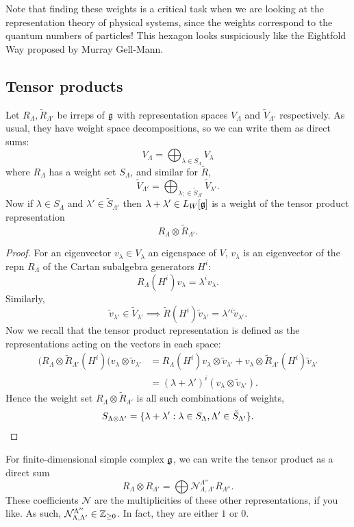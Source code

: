 Note that finding these weights is a critical task when we are looking at the representation theory of physical systems, since the weights correspond to the quantum numbers of particles! This hexagon looks suspiciously like the Eightfold Way proposed by Murray Gell-Mann.

\subsection*{Tensor products} Let $R_\Lambda,\tilde R_{\Lambda'}$ be irreps of $\mathfrak{g}$ with representation spaces $V_\Lambda$ and $\tilde V_{\Lambda'}$ respectively. As usual, they have weight space decompositions, so we can write them as direct sums:
$$V_\Lambda =\bigoplus_{\lambda\in S_\Lambda}V_\lambda$$
where $R_\Lambda$ has a weight set $S_\Lambda$, and similar for $\tilde R$,
$$\tilde V_{\Lambda'} =\bigoplus_{\lambda;\in \tilde S_{\Lambda'}}\tilde V_{\lambda'}.$$
Now if $\lambda \in S_\Lambda$ and $\lambda'\in \tilde S_{\Lambda'}$ then $\lambda+\lambda'\in L_W[\mathfrak{g}]$ is a weight of the tensor product representation
$$R_\Lambda \otimes \tilde R_{\Lambda'}.$$
\begin{proof}
For an eigenvector $v_\lambda \in V_\lambda$ an eigenspace of $V$, $v_\lambda$ is an eigenvector of the repn $R_\Lambda$ of the Cartan subalgebra generators $H^i$:
$$R_\Lambda(H^i)v_\lambda=\lambda^i v_\lambda.$$
Similarly,
$$\tilde v_{\lambda'}\in \tilde V_{\lambda'}\implies \tilde R(H^i)\tilde v_{\lambda'} = \lambda'{}^i \tilde v_{\lambda'}.$$
Now we recall that the tensor product representation is defined as the representations acting on the vectors in each space:
\begin{align*}
    (R_\Lambda \otimes \tilde R_{\Lambda'}(H^i)(v_\lambda\otimes \tilde v_{\lambda'}&= R_\Lambda (H^i)v_\lambda \otimes \tilde v_{\lambda'}
    +v_\lambda \otimes \tilde R_{\Lambda'}(H^i)\tilde v_{\lambda'}\\
    &=(\lambda+\lambda')^i(v_\lambda\otimes \tilde v_{\lambda'}).
\end{align*}
Hence the weight set $R_\Lambda \otimes \tilde R_{\Lambda'}$ is all such combinations of weights,
$$S_{\Lambda\otimes \Lambda'}=\{\lambda+\lambda':\lambda\in S_\Lambda, \Lambda' \in \tilde S_{\Lambda'}\}.$$
\end{proof}
For finite-dimensional simple complex $\mathfrak{g}$, we can write the tensor product as a direct sum
$$R_\Lambda \otimes R_{\Lambda'} =\bigoplus \mathcal{N}_{\Lambda,\Lambda'}^{\Lambda''}R_{\Lambda''}.$$
These coefficients $\mathcal{N}$ are the multiplicities of these other representations, if you like. As such, $\mathcal{N}_{\Lambda,\Lambda'}^{\Lambda''}\in \mathbb{Z}_{\geq 0}$. In fact, they are either $1$ or $0$.

